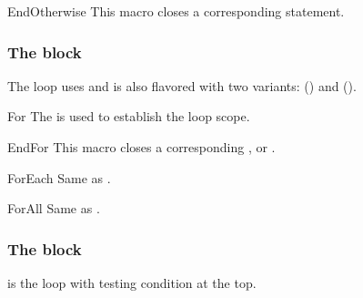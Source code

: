 \documentclass[a4paper, 11pt]{article}
\begin{document}
\begin{Macrodef}{EndOtherwise}{}{}
    This macro closes a corresponding  statement.

    \MacroOptionsText
\end{Macrodef}

\subsubsection{The  block}
The  loop uses  and is also flavored with two variants:  () and  ().

\begin{PDExample}
    \begin{algorithmic}
        \EndFor
        \EndFor
        \EndFor
    \end{algorithmic}
\end{PDExample}


\begin{Macrodef}{For}{}{}
    The  is used to establish the loop scope.

    \BlockOptionsText
\end{Macrodef}

\begin{Macrodef}{EndFor}{}{}
    This macro closes a corresponding ,  or .

    \MacroOptionsText
\end{Macrodef}

\begin{Macrodef}{ForEach}{}{}
    Same as .
\end{Macrodef}

\begin{Macrodef}{ForAll}{}{}
    Same as .
\end{Macrodef}

\subsubsection{The  block}
 is the loop with testing condition at the top.
\end{document}
